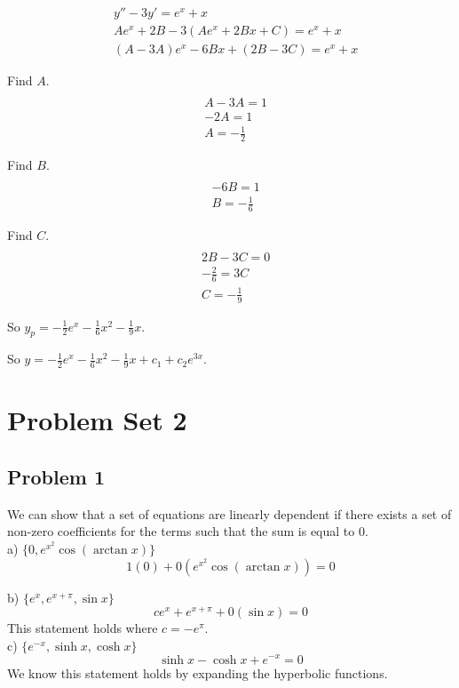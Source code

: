\documentclass[titlepage]{article}
\begin{document}
\begin{align*}
  &y'' - 3y' = e^x + x
  \\ &Ae^x + 2B - 3(Ae^x + 2Bx + C) = e^x + x
  \\ &(A- 3A)e^x - 6Bx + (2B - 3C) = e^x + x
\end{align*}

Find $A$.
\begin{align*}
  \\ &A - 3A = 1
  \\ &-2A = 1
  \\ &A = -\frac{1}{2}
\end{align*}

Find $B$.
\begin{align*}
  \\ &-6B = 1
  \\ &B = -\frac{1}{6}
\end{align*}

Find $C$.
\begin{align*}
  \\ &2B - 3C = 0
  \\ &-\frac{2}{6} = 3C
  \\ &C = -\frac{1}{9}
\end{align*}


So $y_p = -\frac{1}{2}e^x -\frac{1}{6}x^2 - \frac{1}{9}x$.

So $y = -\frac{1}{2}e^x -\frac{1}{6}x^2 - \frac{1}{9}x + c_1 + c_2e^{3x}$.

\section{Problem Set 2}
\subsection{Problem 1}

We can show that a set of equations are linearly dependent if there exists a set of non-zero coefficients for the terms such that the sum is equal to 0.\\

\noindent a) $\{0, e^{x^2} \cos(\arctan x)\}$
$$1(0) + 0(e^{x^2} \cos(\arctan x)) = 0$$

\noindent b) $\{e^x, e^{x+\pi}, \sin x\}$
$$ce^x + e^{x + \pi} + 0(\sin x) = 0$$
This statement holds where $c = -e^{\pi}.$\\

\noindent c) $\{e^{-x}, \sinh x, \cosh x\}$
$$\sinh x - \cosh x + e^{-x} = 0$$
We know this statement holds by expanding the hyperbolic functions.
\end{document}
